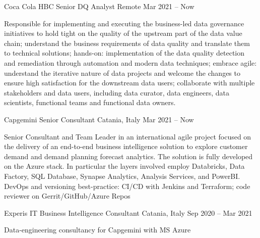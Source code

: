 
  \begin{cventries}
    \cventry
    {Coca Cola HBC}    
    {Senior DQ Analyst}
    {Remote}
    {Mar 2021 -- Now}
    {
      \begin{cvitems}
        \item {Responsible for implementing and executing the business-led data governance initiatives 
        to hold tight on the quality of the upstream part of the data value chain;
        understand the business requirements of data quality and translate them to technical solutions; 
        hands-on: implementation of the data quality detection and remediation through automation and modern data techniques;
        embrace agile: understand the iterative nature of data projects and welcome the changes to ensure high satisfaction for the downstream data users;
        collaborate with multiple stakeholders and data users, including data curator, data engineers, data scientists, 
        functional teams and functional data owners.}
      \end{cvitems}
    }

    \cventry
    {Capgemini}    
    {Senior Consultant}
    {Catania, Italy}
    {Mar 2021 -- Now}
    {
      \begin{cvitems}
        \item {Senior Consultant and Team Leader in an international agile project focused on the delivery of an end-to-end business intelligence solution to explore customer demand and demand planning forecast analytics. The solution is fully developed on the Azure stack. In particular the layers involved employ Databricks, Data Factory, SQL Database, Synapse Analytics, Analysis Services, and PowerBI. DevOps and versioning best-practice: CI/CD with Jenkins and Terraform; code reviewer on Gerrit/GitHub/Azure Repos}
      \end{cvitems}
    }

    \cventry
    {Experis IT}    
    {Business Intelligence Consultant}
    {Catania, Italy}
    {Sep 2020 -- Mar 2021}
    {
      \begin{cvitems}
        \item {Data-engineering consultancy for Capgemini with MS Azure}
      \end{cvitems}
    }


\end{cventries}
